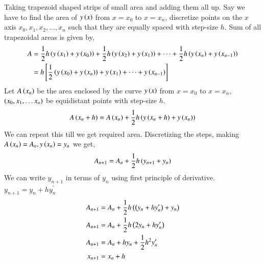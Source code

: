 \documentclass[journal]{IEEEtran}
\begin{document}
Taking trapezoid shaped strips of small area and adding them all up. Say we have to find the area of $y\left(x\right)$ from $x=x_0$ to $x=x_n$, discretize points on the $x$ axis $x_0, x_1, x_2, \dots, x_n$ such that they are equally spaced with step-size $h$. \newline
Sum of all trapezoidal areas is given by,
\begin{align}
  A&=\frac{1}{2}h\left(y\left(x_1\right)+y\left(x_0\right)\right)+ \frac{1}{2}h\left(y\left(x_2\right)+y\left(x_1\right)\right)+\dots+\frac{1}{2}h\left(y\left(x_n\right)+y\left(x_{n-1}\right)\right)\\
  &=h{}\left[\frac{1}{2}\left(y\left(x_0\right)+y\left(x_n\right)\right)+ y\left(x_1\right)+\dots+y\left(x_{n-1}\right)\right]
\end{align}
Let $A\left(x_n\right)$ be the area enclosed by the curve $y\left(x\right)$ from $x=x_0$ to $x=x_n$, $\left(x_0, x_1, \dots x_n\right)$ be equidistant points with step-size $h$.
\begin{align}
  A\left(x_n+h\right)=A\left(x_n\right)+\frac{1}{2}h\left(y\left(x_n+h\right)+y\left(x_n\right)\right)
\end{align}
We can repeat this till we get required area.\newline
Discretizing the steps, making $A\left(x_n\right)=A_n, y\left(x_n\right)=y_n$ we get,
\begin{align}
 A_{n+1}=A_n+\frac{1}{2}h\left(y_{n+1}+y_n\right)
\end{align}
We can write $y_{n+1}$ in terms of $y_n$ using first principle of derivative. $y_{n+1}=y_n+hy^{\prime}_n$
\begin{align}
  A_{n+1}&=A_n+\frac{1}{2}h\left(\left(y_{n}+hy^{\prime}_n\right)+y_n\right)\\
  A_{n+1}&=A_n+\frac{1}{2}h\left(2y_n+hy^{\prime}_n\right)\\
  A_{n+1}&=A_n+hy_n+\frac{1}{2}h^2y^{\prime}_n\\
  x_{n+1}&=x_n+h
\end{align}
\end{document}
